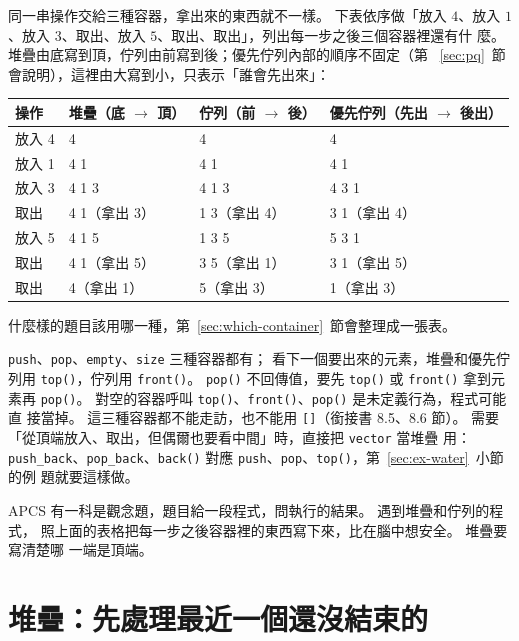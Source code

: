 同一串操作交給三種容器，拿出來的東西就不一樣。 下表依序做「放入 $4$、放入
$1$、放入 $3$、取出、放入 $5$、取出、取出」，列出每一步之後三個容器裡還有什
麼。 堆疊由底寫到頂，佇列由前寫到後；優先佇列內部的順序不固定（第
~\ref{sec:pq}~節會說明），這裡由大寫到小，只表示「誰會先出來」：

\begin{center}
\begin{tabular}{llll}
\toprule
操作 & 堆疊（底 $\to$ 頂） & 佇列（前 $\to$ 後） & 優先佇列（先出 $\to$ 後出） \\
\midrule
放入 4 & 4 & 4 & 4 \\
放入 1 & 4 1 & 4 1 & 4 1 \\
放入 3 & 4 1 3 & 4 1 3 & 4 3 1 \\
取出 & 4 1（拿出 3） & 1 3（拿出 4） & 3 1（拿出 4） \\
放入 5 & 4 1 5 & 1 3 5 & 5 3 1 \\
取出 & 4 1（拿出 5） & 3 5（拿出 1） & 3 1（拿出 5） \\
取出 & 4（拿出 1） & 5（拿出 3） & 1（拿出 3） \\
\bottomrule
\end{tabular}
\end{center}

什麼樣的題目該用哪一種，第~\ref{sec:which-container}~節會整理成一張表。

\begin{bridgerecap}[三種容器的操作]
\texttt{push}、\texttt{pop}、\texttt{empty}、\texttt{size} 三種容器都有；
看下一個要出來的元素，堆疊和優先佇列用 \texttt{top()}，佇列用
\texttt{front()}。 \texttt{pop()} 不回傳值，要先 \texttt{top()} 或
\texttt{front()} 拿到元素再 \texttt{pop()}。 對空的容器呼叫
\texttt{top()}、\texttt{front()}、\texttt{pop()} 是未定義行為，程式可能直
接當掉。 這三種容器都不能走訪，也不能用 \texttt{[]}（銜接書 8.5、8.6 節）。
需要「從頂端放入、取出，但偶爾也要看中間」時，直接把 \texttt{vector} 當堆疊
用：\texttt{push\_back}、\texttt{pop\_back}、\texttt{back()} 對應
\texttt{push}、\texttt{pop}、\texttt{top()}，第~\ref{sec:ex-water}~小節的例
題就要這樣做。
\end{bridgerecap}

\begin{apcsnote}
APCS 有一科是觀念題，題目給一段程式，問執行的結果。 遇到堆疊和佇列的程式，
照上面的表格把每一步之後容器裡的東西寫下來，比在腦中想安全。 堆疊要寫清楚哪
一端是頂端。
\end{apcsnote}

\section{堆疊：先處理最近一個還沒結束的}
\label{sec:stack}


